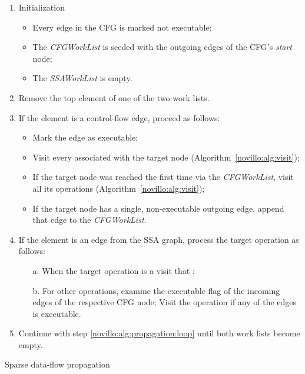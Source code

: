 \begin{algorithm}[h!]
  \begin{enumerate}
    \item Initialization
          \begin{itemize}
            \vspace{-1.2ex}
            \item Every edge in the CFG is marked not executable;
            \item The \emph{CFGWorkList} is seeded with the outgoing edges
                  of the CFG's \emph{start} node;
            \item The \emph{SSAWorkList} is empty.
          \end{itemize}
          \vspace{-1ex}
    \item \label{novillo:alg:propagation:loop} Remove the top element of one
          of the two work lists.
    \item \label{novillo:alg:propagation:flowedge} If the element is 
      a control-flow edge, proceed as follows:
          \begin{itemize}
            \vspace{-1.2ex}
            \item Mark the edge as executable;
            \item Visit every \phifun associated with the target
                  node (Algorithm~\ref{novillo:alg:visit});
            \item If the target node was reached the first time via the
                  \emph{CFGWorkList}, visit all its operations (Algorithm~\ref{novillo:alg:visit});
            \item If the target node has a single, non-executable outgoing
                  edge, append that edge to the \emph{CFGWorkList}.
          \end{itemize}
          \vspace{-1ex}
    \item \label{novillo:alg:propagation:ssaedge} If the element is an edge from
          the SSA graph, process the target operation as follows:
          \begin{enumerate}
            \vspace{-1.2ex}
            \item[a.] When the target operation is a \phifun visit that
                      \phifun;
            \item[b.] \label{novillo:alg:propagation:ssaedge:regular} For other
                      operations, examine the executable flag of the incoming
                      edges of the respective CFG node; Visit the operation
                      if any of the edges is executable.
          \end{enumerate}
          \vspace{-1ex}
    \item Continue with step \ref{novillo:alg:propagation:loop} until both work
          lists become empty.
  \end{enumerate}

  \caption{Sparse data-flow propagation}
  \label{alg:constant_propagation_is_easier:propagation}
\end{algorithm}


